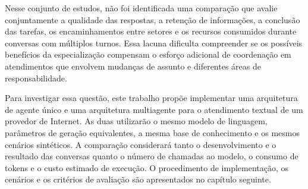 Nesse conjunto de estudos, não foi identificada uma comparação que avalie conjuntamente a qualidade das respostas, a retenção de informações, a conclusão das tarefas, os encaminhamentos entre setores e os recursos consumidos durante conversas com múltiplos turnos. Essa lacuna dificulta compreender se os possíveis benefícios da especialização compensam o esforço adicional de coordenação em atendimentos que envolvem mudanças de assunto e diferentes áreas de responsabilidade.

Para investigar essa questão, este trabalho propõe implementar uma arquitetura de agente único e uma arquitetura multiagente para o atendimento textual de um provedor de Internet. As duas utilizarão o mesmo modelo de linguagem, parâmetros de geração equivalentes, a mesma base de conhecimento e os mesmos cenários sintéticos. A comparação considerará tanto o desenvolvimento e o resultado das conversas quanto o número de chamadas ao modelo, o consumo de tokens e o custo estimado de execução. O procedimento de implementação, os cenários e os critérios de avaliação são apresentados no capítulo seguinte.